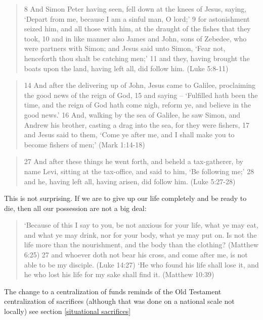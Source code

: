 \documentclass[11pt]{article}
\begin{document}
 \begin{quote}
8 And Simon Peter having seen, fell down at the knees of Jesus, saying, `Depart from me, because I am a sinful man, O lord;'
9 for astonishment seized him, and all those with him, at the draught of the fishes that they took,
10 and in like manner also James and John, sons of Zebedee, who were partners with Simon; and Jesus said unto Simon, `Fear not, henceforth thou shalt be catching men;'
11 and they, having brought the boats upon the land, having left all, did follow him. (Luke 5:8-11)\end{quote}
\begin{quote}
14 And after the delivering up of John, Jesus came to Galilee, proclaiming the good news of the reign of God,
15 and saying -- `Fulfilled hath been the time, and the reign of God hath come nigh, reform ye, and believe in the good news.'
16 And, walking by the sea of Galilee, he saw Simon, and Andrew his brother, casting a drag into the sea, for they were fishers,
17 and Jesus said to them, `Come ye after me, and I shall make you to become fishers of men;' (Mark 1:14-18)\end{quote}
\begin{quote}
27 And after these things he went forth, and beheld a tax-gatherer, by name Levi, sitting at the tax-office, and said to him, `Be following me;'
28 and he, having left all, having arisen, did follow him.
(Luke 5:27-28)\end{quote}

This is not surprising. If we are to give up our life completely and be ready to die, then all our possession are not a big deal:

\begin{quote}
`Because of this I say to you, be not anxious for your life, what ye may eat, and what ye may drink, nor for your body, what ye may put on. Is not the life more than the nourishment, and the body than the clothing? (Matthew 6:25)
27 and whoever doth not bear his cross, and come after me, is not able to be my disciple. (Luke 14:27)
 `He who found his life shall lose it, and he who lost his life for my sake shall find it. (Matthew 10:39) \end{quote}
The change to a centralization of funds reminds of the Old Testament centralization of sacrifices (although that was done on a national scale not locally) see section \ref{situational sacrifices} 
\end{document}
